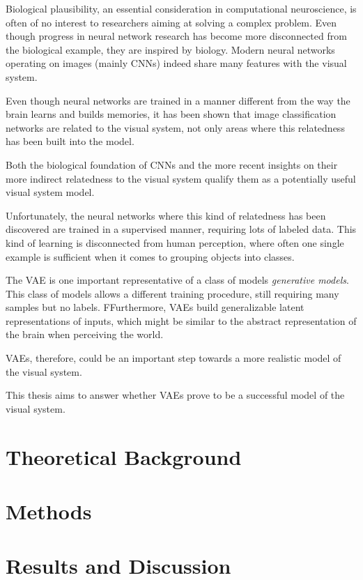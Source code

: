 \documentclass[11pt]{article}
\let\oldsection\section
\renewcommand\section{\clearpage\oldsection}
\begin{document}
Biological plausibility, an essential consideration in computational neuroscience, is often of no interest to researchers aiming at solving a complex problem.
Even though progress in neural network research has become more disconnected from the biological example, they are inspired by biology.
Modern neural networks operating on images (mainly \acp{CNN}) indeed share many features with the visual system.

Even though neural networks are trained in a manner different from the way the brain learns and builds memories, it has been shown that image classification networks are related to the visual system, not only areas where this relatedness has been built into the model.

Both the biological foundation of \acp{CNN} and the more recent insights on their more indirect relatedness to the visual system qualify them as a potentially useful visual system model.

Unfortunately, the neural networks where this kind of relatedness has been discovered are trained in a supervised manner, requiring lots of labeled data.
This kind of learning is disconnected from human perception, where often one single example is sufficient when it comes to grouping objects into classes.

The \ac{VAE} is one important representative of a class of models \textit{generative models}.
This class of models allows a different training procedure, still requiring many samples but no labels.
FFurthermore, \acp{VAE} build generalizable latent representations of inputs, which might be similar to the abstract representation of the brain when perceiving the world.

\acp{VAE}, therefore, could be an important step towards a more realistic model of the visual system.

This thesis aims to answer whether \acp{VAE} prove to be a successful model of the visual system.

\section{Theoretical Background}\label{sec:theoretical-background}



\section{Methods}\label{sec:methods}



\section{Results and Discussion}\label{sec:results}

\end{document}
